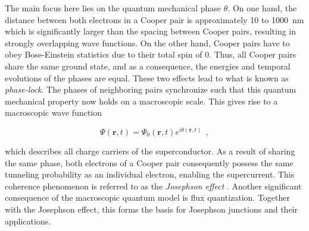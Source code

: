 The main focus here lies on the quantum mechanical phase $\theta$. On one hand, the distance between both electrons in a Cooper pair is approximately 10 to \qty{1000}{\nm} which is significantly larger than the spacing between Cooper pairs, resulting in strongly overlapping wave functions. On the other hand, Cooper pairs have to obey Bose-Einstein statistics due to their total spin of 0. Thus, all Cooper pairs share the same ground state, and as a consequence, the energies and temporal evolutions of the phases are equal. These two effects lead to what is known as \textit{phase-lock}. The phases of neighboring pairs synchronize such that this quantum mechanical property now holds on a macroscopic scale. This gives rise to a macroscopic wave function

\begin{equation}
\Psi(\textbf{r},t) = \Psi_0(\textbf{r},t)e^{i\theta(\textbf{r},t)} \ \ ,
\end{equation}

which describes all charge carriers of the superconductor. As a result of sharing the same phase, both electrons of a Cooper pair consequently possess the same tunneling probability as an individual electron, enabling the supercurrent. This coherence phenomenon is referred to as the \textit{Josephson effect} \cite{Josephson1962}. Another significant consequence of the macroscopic quantum model is flux quantization. Together with the Josephson effect, this forms the basis for Josephson junctions and their applications. 


